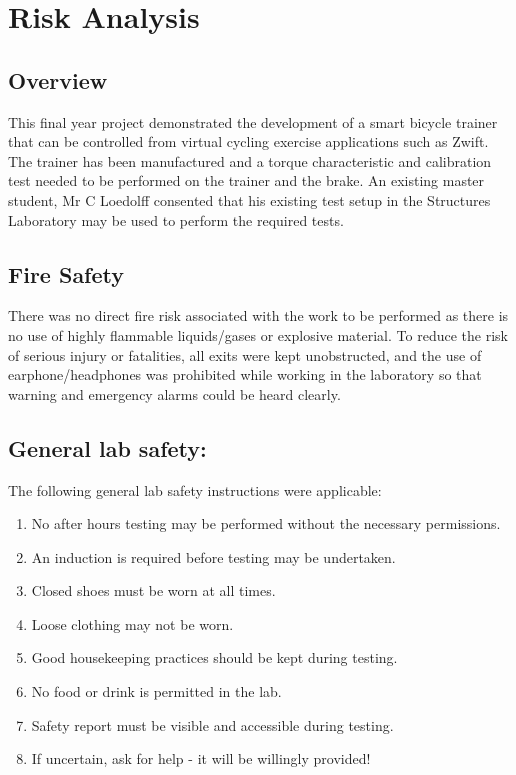 \newpage

\chapter{Risk Analysis}

\section*{Overview}

This final year project demonstrated the development of a smart bicycle trainer that can be controlled from virtual cycling exercise applications such as Zwift. The trainer has been manufactured and a torque characteristic and calibration test needed to be performed on the trainer and the brake. An existing master student, Mr C Loedolff consented that his existing test setup in the Structures Laboratory may be used to perform the required tests.

\section*{Fire Safety}

There was no direct fire risk associated with the work to be performed as there is no use of highly flammable liquids/gases or explosive material. To reduce the risk of serious injury or fatalities, all exits were kept unobstructed, and the use of earphone/headphones was prohibited while working in the laboratory so that warning and emergency alarms could be heard clearly.

\newpage

\section*{General lab safety:}
The following general lab safety instructions were applicable:
\begin{enumerate}
	\item No after hours testing may be performed without the necessary permissions.
	\item An induction is required before testing may be undertaken.
	\item Closed shoes must be worn at all times.
	\item Loose clothing may not be worn.
	\item Good housekeeping practices should be kept during testing.
	\item No food or drink is permitted in the lab.
	\item Safety report must be visible and accessible during testing.
	\item If uncertain, ask for help - it will be willingly provided!
\end{enumerate}

